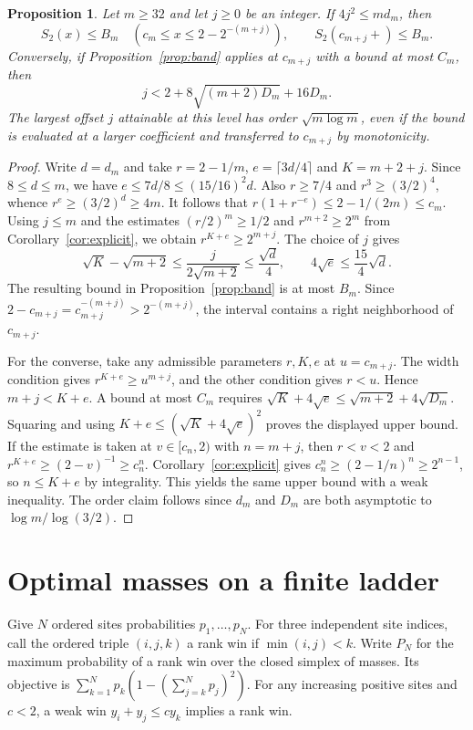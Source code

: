 \documentclass[11pt,reqno]{amsart}
\newtheorem{proposition}[theorem]{Proposition}
\begin{document}
\begin{proposition}\label{prop:range}
Let $m\ge32$ and let $j\ge0$ be an integer. If $4j^2\le m d_m$, then
\[
 S_2(x)\le B_m\quad(c_m\le x\le2-2^{-(m+j)}),\qquad
 S_2(c_{m+j}+)\le B_m .
\]
Conversely, if Proposition~\ref{prop:band}
applies at $c_{m+j}$ with a bound at most $C_m$, then
\[
 j<2+8\sqrt{(m+2)D_m}+16D_m .
\]
The largest offset $j$ attainable at this level has order
$\sqrt{m\log m}$, even if the bound is evaluated at a larger
coefficient and transferred to $c_{m+j}$ by monotonicity.
\end{proposition}
\begin{proof}
Write $d=d_m$ and take $r=2-1/m$, $e=\lceil3d/4\rceil$ and
$K=m+2+j$. Since $8\le d\le m$, we have $e\le7d/8\le(15/16)^2d$.
Also $r\ge7/4$ and $r^3\ge(3/2)^4$, whence $r^e\ge(3/2)^d\ge4m$.
It follows that $r(1+r^{-e})\le2-1/(2m)\le c_m$. Using $j\le m$
and the estimates $(r/2)^m\ge1/2$ and $r^{m+2}\ge2^m$ from
Corollary~\ref{cor:explicit}, we obtain $r^{K+e}\ge2^{m+j}$.
The choice of $j$ gives
\[
 \sqrt K-\sqrt{m+2}\le\frac{j}{2\sqrt{m+2}}\le\frac{\sqrt d}{4},
 \qquad 4\sqrt e\le\frac{15}{4}\sqrt d .
\]
The resulting bound in Proposition~\ref{prop:band} is at most $B_m$.
Since $2-c_{m+j}=c_{m+j}^{-(m+j)}>2^{-(m+j)}$, the interval
contains a right neighborhood of $c_{m+j}$.

For the converse, take any admissible parameters $r,K,e$ at
$u=c_{m+j}$. The width condition gives $r^{K+e}\ge u^{m+j}$,
and the other condition gives $r<u$. Hence $m+j<K+e$.
A bound at most $C_m$ requires
$\sqrt K+4\sqrt e\le\sqrt{m+2}+4\sqrt{D_m}$. Squaring and using
$K+e\le(\sqrt K+4\sqrt e)^2$ proves the displayed upper bound.
If the estimate is taken at $v\in[c_n,2)$ with $n=m+j$, then $r<v<2$
and $r^{K+e}\ge(2-v)^{-1}\ge c_n^n$. Corollary~\ref{cor:explicit}
gives $c_n^n\ge(2-1/n)^n\ge2^{n-1}$, so $n\le K+e$ by integrality.
This yields the same upper bound with a weak inequality. The order
claim follows since $d_m$ and $D_m$ are both asymptotic to
$\log m/\log(3/2)$.
\end{proof}

\section{Optimal masses on a finite ladder}
Give $N$ ordered sites probabilities $p_1,\ldots,p_N$.
For three independent site indices, call the ordered triple $(i,j,k)$
a rank win if $\min(i,j)<k$. Write $P_N$ for the maximum probability
of a rank win over the closed simplex of masses. Its objective is
$\sum_{k=1}^N p_k(1-(\sum_{j=k}^N p_j)^2)$.
For any increasing positive sites and $c<2$, a weak win
$y_i+y_j\le cy_k$ implies a rank win.
\end{document}
